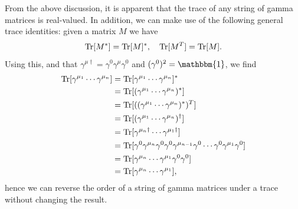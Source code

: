 From the above discussion, it is apparent that the trace of any string of gamma matrices is real-valued. In addition, we can make use of the following general trace identities: given a matrix $M$ we have
\begin{equation}
    \operatorname{Tr}[M^*] = \operatorname{Tr}[M]^*, \quad \operatorname{Tr}[M^T] = \operatorname{Tr}[M].
\end{equation}
Using this, and that $\gamma^{\mu\dagger}=\gamma^0\gamma^\mu\gamma^0$ and $(\gamma^0)^2=\mathbbm{1}$, we find
\begin{align}
    \operatorname{Tr}[\gamma^{\mu_1}\cdots\gamma^{\mu_n}] &= \operatorname{Tr}[\gamma^{\mu_1}\cdots\gamma^{\mu_n}]^*
    \nonumber \\
    &= \operatorname{Tr}[(\gamma^{\mu_1}\cdots\gamma^{\mu_n})^*]
    \nonumber \\
    &= \operatorname{Tr}[((\gamma^{\mu_1}\cdots\gamma^{\mu_n})^*)^T]
    \nonumber \\
    &= \operatorname{Tr}[(\gamma^{\mu_1}\cdots\gamma^{\mu_n})^\dagger]
    \nonumber \\
    &= \operatorname{Tr}[\gamma^{\mu_n\dagger}\cdots\gamma^{\mu_1\dagger}]
    \nonumber \\
    &= \operatorname{Tr}[\gamma^0\gamma^{\mu_n}\gamma^0\gamma^0\gamma^{\mu_{n-1}}\gamma^0\cdots\gamma^0\gamma^{\mu_1}\gamma^0]
    \nonumber \\
    &= \operatorname{Tr}[\gamma^{\mu_n}\cdots\gamma^{\mu_1}\gamma^0\gamma^0]
    \nonumber \\
    &= \operatorname{Tr}[\gamma^{\mu_n}\cdots\gamma^{\mu_1}],
    \label{eq:gamma_reverse}
\end{align}
hence we can reverse the order of a string of gamma matrices under a trace without changing the result.


